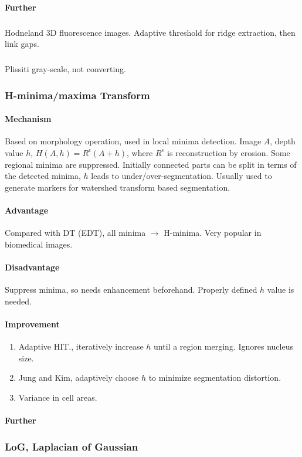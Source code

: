 \documentclass[10pt,a4paper]{article}
\begin{document}
\paragraph{Further}
\subparagraph{}Hodneland 3D fluorescence images. Adaptive threshold for ridge extraction, then link gaps.
\subparagraph{}Plissiti gray-scale, not converting.

\subsubsection{H-minima/maxima Transform}
\paragraph{Mechanism}
Based on morphology operation, used in local minima detection. Image $A$, depth value $h$, $H(A,h)=R^{\epsilon}(A+h)$, where $R^{\epsilon}$ is reconstruction by erosion. Some regional minima are suppressed. Initially connected parts can be split in terms of the detected minima, $h$ leads to under/over-segmentation. Usually used to generate markers for watershed transform based segmentation.
\paragraph{Advantage}
Compared with DT (EDT), all minima $\to$ H-minima. Very popular in biomedical images.
\paragraph{Disadvantage}
Suppress minima, so needs enhancement beforehand. Properly defined $h$ value is needed.
\paragraph{Improvement}
\begin{enumerate}
	\item Adaptive HIT., iteratively increase $h$ until a region merging. Ignores nucleus size.
	\item Jung and Kim, adaptively choose $h$ to minimize segmentation distortion.
	\item Variance in cell areas.
\end{enumerate}
\paragraph{Further}

\subsubsection{LoG, Laplacian of Gaussian}
\end{document}
